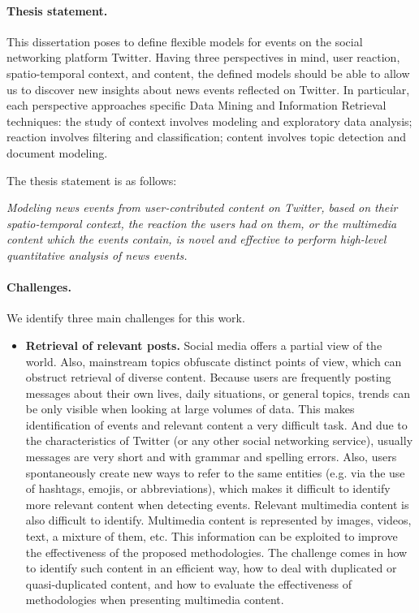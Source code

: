 \begin{intro}

\paragraph{Thesis statement.} 
%
This dissertation poses to define flexible models for events on the social
networking platform Twitter. 
%
Having three perspectives in mind, user reaction, spatio-temporal context, and
content, the defined models should be able to allow us to discover new insights
about news events reflected on Twitter. 
%
In particular, each perspective approaches specific Data Mining and Information
Retrieval techniques: 
%
the study of context involves modeling and exploratory data analysis; 
%
reaction involves filtering and classification;
%
content involves topic detection and document modeling.

The thesis statement is as follows:

{\em
Modeling news events from user-contributed content on Twitter, based on
their spatio-temporal context, the reaction the users had on them, or the
multimedia content which the events contain, is novel and effective to perform
high-level quantitative analysis of news events.
}

\paragraph{Challenges.} We identify three main challenges for this work.

\begin{itemize}
    \item {\bf Retrieval of relevant posts.} 
    Social media offers a partial view of the world. 
    Also, mainstream topics obfuscate distinct points of view, which can
    obstruct retrieval of diverse content. 
    Because users are frequently posting messages about their own lives, daily
    situations, or general topics, trends can be only visible when looking at large
    volumes of data. 
    This makes identification of events and relevant content a very difficult task.
    And due to the characteristics of Twitter (or any other social networking
    service), usually messages are very short and with grammar and spelling
    errors. 
    Also, users spontaneously create new ways to refer to the same entities
    (e.g. via the use of hashtags, emojis, or abbreviations), which makes it
    difficult to identify more relevant content when detecting events.
    Relevant multimedia content is also difficult to identify. 
    Multimedia content is represented by images, videos, text, a mixture of
    them, etc. 
    This information can be exploited to improve the effectiveness of
    the proposed methodologies. 
    The challenge comes in how to identify such content in an efficient way, how
    to deal with duplicated or quasi-duplicated content, and how to evaluate the
    effectiveness of methodologies when presenting multimedia content. 


\end{itemize}
\end{intro}
